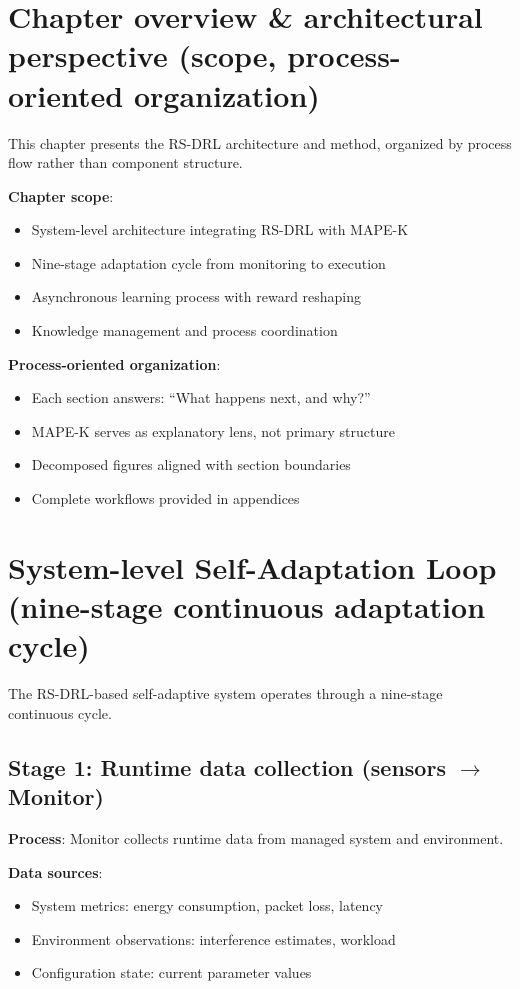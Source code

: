 \documentclass[11pt,a4paper]{article}
\begin{document}
\section{Chapter overview \& architectural perspective (scope, process-oriented organization)}

This chapter presents the RS-DRL architecture and method, organized by process flow rather than component structure.

\textbf{Chapter scope}:
\begin{itemize}
    \item System-level architecture integrating RS-DRL with MAPE-K
    \item Nine-stage adaptation cycle from monitoring to execution
    \item Asynchronous learning process with reward reshaping
    \item Knowledge management and process coordination
\end{itemize}

\textbf{Process-oriented organization}:
\begin{itemize}
    \item Each section answers: ``What happens next, and why?''
    \item MAPE-K serves as explanatory lens, not primary structure
    \item Decomposed figures aligned with section boundaries
    \item Complete workflows provided in appendices
\end{itemize}

\section{System-level Self-Adaptation Loop (nine-stage continuous adaptation cycle)}

The RS-DRL-based self-adaptive system operates through a nine-stage continuous cycle.

\subsection{Stage 1: Runtime data collection (sensors $\rightarrow$ Monitor)}

\textbf{Process}: Monitor collects runtime data from managed system and environment.

\textbf{Data sources}:
\begin{itemize}
    \item System metrics: energy consumption, packet loss, latency
    \item Environment observations: interference estimates, workload
    \item Configuration state: current parameter values
\end{itemize}
\end{document}
